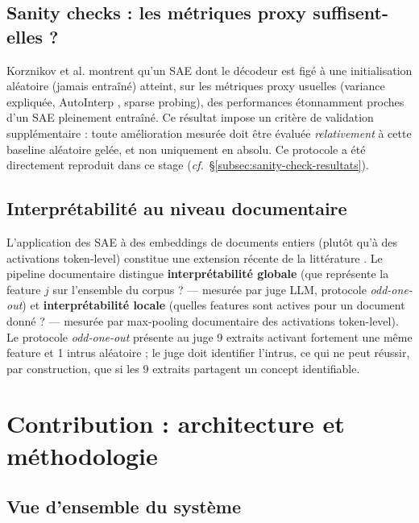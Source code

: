 \documentclass[11pt]{article}
\begin{document}
\subsection{Sanity checks : les métriques proxy suffisent-elles ?}

Korznikov et al. \cite{korznikov2025sanitychecks} montrent qu'un SAE dont le
décodeur est figé à une initialisation aléatoire (jamais entraîné) atteint,
sur les métriques proxy usuelles (variance expliquée, AutoInterp
\cite{bills2023language}, sparse probing), des performances étonnamment
proches d'un SAE pleinement entraîné.
Ce résultat impose un critère de validation supplémentaire : toute
amélioration mesurée doit être évaluée \emph{relativement} à cette baseline
aléatoire gelée, et non uniquement en absolu. Ce protocole a été directement
reproduit dans ce stage (\emph{cf.}~\S\ref{subsec:sanity-check-resultats}).

\subsection{Interprétabilité au niveau documentaire}

L'application des SAE à des embeddings de documents entiers (plutôt qu'à des
activations token-level) constitue une extension récente de la littérature
\cite{jiang2024sae_embeddings, decodedense2025}. Le pipeline documentaire
distingue \textbf{interprétabilité globale} (que représente la feature $j$ sur
l'ensemble du corpus ? --- mesurée par juge LLM, protocole \emph{odd-one-out})
et \textbf{interprétabilité locale} (quelles features sont actives pour un
document donné ? --- mesurée par max-pooling documentaire des activations
token-level). Le protocole \emph{odd-one-out}
\cite{templeton2024scaling, karvonen2025saebench} présente au juge 9 extraits activant fortement une
même feature et 1 intrus aléatoire ; le juge doit identifier l'intrus, ce qui
ne peut réussir, par construction, que si les 9 extraits partagent un concept
identifiable.

\newpage
\section{Contribution : architecture et méthodologie}
\label{sec:contribution}

\subsection{Vue d'ensemble du système}
\end{document}
